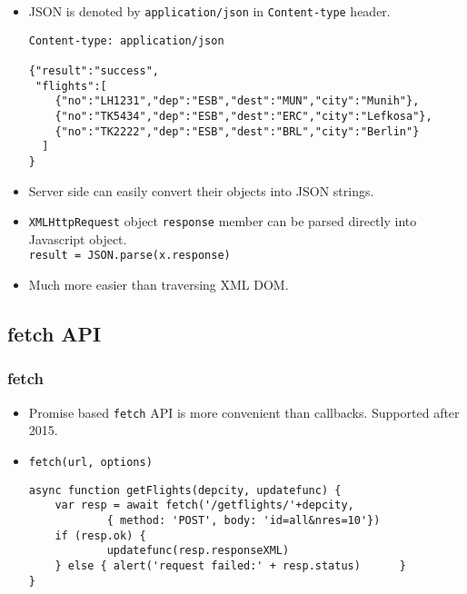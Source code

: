 \documentclass[trans,compress,xcolor=table]{beamer}
\begin{document}
\begin{frame}[fragile]
\begin{itemize}
\item JSON is denoted by \lstinline!application/json! in 
	\lstinline!Content-type! header.
\begin{lstlisting}
Content-type: application/json

{"result":"success",
 "flights":[ 
    {"no":"LH1231","dep":"ESB","dest":"MUN","city":"Munih"},
    {"no":"TK5434","dep":"ESB","dest":"ERC","city":"Lefkosa"},
    {"no":"TK2222","dep":"ESB","dest":"BRL","city":"Berlin"}
  ]
}
\end{lstlisting}
\item Server side can easily convert their objects into JSON strings.
\item \lstinline!XMLHttpRequest! object \lstinline!response!
	member can be parsed directly into Javascript object.\\
 \lstinline!result = JSON.parse(x.response)!
\item Much more easier than traversing XML DOM.
\end{itemize}
\end{frame}

\subsection*{fetch API}
\begin{frame}[fragile]
\frametitle{fetch}
\begin{itemize}
\item Promise based \lstinline!fetch! API is more convenient than callbacks. Supported after 2015.
\item \lstinline!fetch(url, options)!
\begin{lstlisting}
async function getFlights(depcity, updatefunc) {
	var resp = await fetch('/getflights/'+depcity, 
			{ method: 'POST', body: 'id=all&nres=10'})
	if (resp.ok) {
            updatefunc(resp.responseXML)    
	} else { alert('request failed:' + resp.status)		 } 
}
\end{lstlisting}
\end{itemize}
\end{frame}
\end{document}
